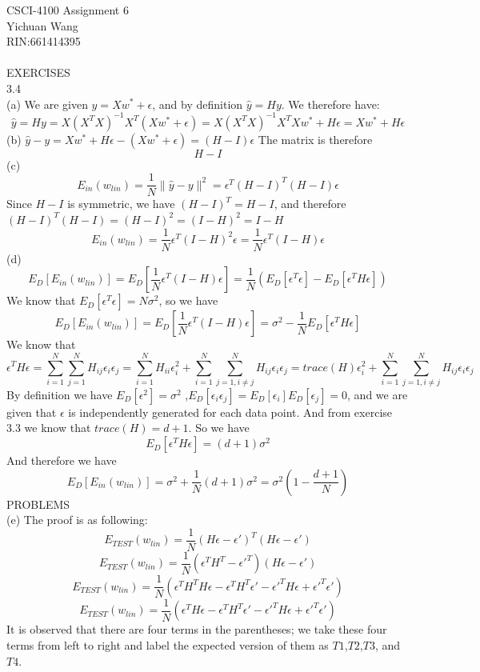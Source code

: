 \documentclass[12pt]{article}
\begin{document}
CSCI-4100 Assignment 6\\
Yichuan Wang \\
RIN:661414395\\\\

EXERCISES\\
3.4\\%
(a) We are given $y=Xw^*+\epsilon$, and by definition $\hat{y}=Hy$. We therefore have: 
$$\hat{y}=Hy=X(X^TX)^{-1}X^T(Xw^*+\epsilon)=X(X^TX)^{-1}X^TXw^*+H\epsilon=Xw^*+H\epsilon$$
(b) $\hat{y}-y=Xw^*+H\epsilon-(Xw^*+\epsilon)=(H-I)\epsilon$ The matrix is therefore $$H-I$$
(c) $$E_{in}(w_{lin})=\frac{1}{N}\parallel\hat{y}-y\parallel^2=\epsilon^T(H-I)^T(H-I)\epsilon$$
Since $H-I$ is symmetric, we have $(H-I)^T=H-I$, and therefore $(H-I)^T(H-I)=(H-I)^2=(I-H)^2=I-H$
	$$E_{in}(w_{lin})=\frac{1}{N}\epsilon^T(I-H)^2\epsilon=\frac{1}{N}\epsilon^T(I-H)\epsilon$$
(d) $$E_D[E_{in}(w_{lin})] = E_D[\frac{1}{N}\epsilon^T(I-H)\epsilon]=\frac{1}{N}(E_D[\epsilon^T\epsilon]-E_D[\epsilon^TH\epsilon])$$
	We know that $E_D[\epsilon^T\epsilon] = N\sigma^2$, so we have
	$$E_D[E_{in}(w_{lin})] = E_D[\frac{1}{N}\epsilon^T(I-H)\epsilon]=\sigma^2-\frac{1}{N}E_D[\epsilon^TH\epsilon]$$
	We know that $$\epsilon^TH\epsilon = \sum_{i=1}^N\sum_{j=1}^NH_{ij}\epsilon_i\epsilon_j=\sum_{i=1}^NH_{ii}\epsilon_i^2+\sum_{i=1}^N\sum_{j=1,i \neq j}^NH_{ij}\epsilon_i\epsilon_j=trace(H)\epsilon_i^2+\sum_{i=1}^N\sum_{j=1,i \neq j}^NH_{ij}\epsilon_i\epsilon_j$$   
	By definition we have $E_D[\epsilon^2]=\sigma^2$ ,$E_D[\epsilon_i\epsilon_j]=E_D[\epsilon_i]E_D[\epsilon_j]=0$, and we are given that $\epsilon$ is independently generated for each data point. And from exercise 3.3 we know that $trace(H)=d+1$. So we have $$E_D[\epsilon^TH\epsilon]=(d+1)\sigma^2$$
And therefore we have
$$E_D[E_{in}(w_{lin})]=\sigma^2+\frac{1}{N}(d+1)\sigma^2=\sigma^2(1-\frac{d+1}{N})$$
PROBLEMS\\
(e) The proof is as following:\\
$$E_{TEST}(w_{lin})=\frac{1}{N}(H\epsilon-\epsilon')^T(H\epsilon-\epsilon')$$
$$E_{TEST}(w_{lin})=\frac{1}{N}(\epsilon^TH^T-\epsilon'^T)(H\epsilon-\epsilon')$$
$$E_{TEST}(w_{lin})=\frac{1}{N}(\epsilon^TH^TH\epsilon-\epsilon^TH^T\epsilon'-\epsilon'^TH\epsilon+\epsilon'^T\epsilon')$$
$$E_{TEST}(w_{lin})=\frac{1}{N}(\epsilon^TH\epsilon-\epsilon^TH^T\epsilon'-\epsilon'^TH\epsilon+\epsilon'^T\epsilon')$$
It is observed that there are four terms in the parentheses; we take these four terms from left to right  and label the expected version of them as $T1$,$T2$,$T3$, and $T4$.
\end{document}
